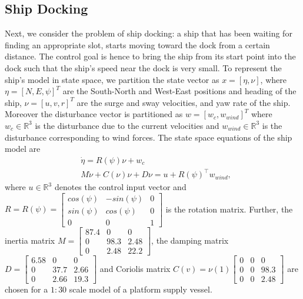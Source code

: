 \subsection{Ship Docking}\label{subsec:6dship}
Next, we consider the problem of ship docking: a ship that has been waiting for finding an appropriate slot, starts moving toward the dock from a certain distance. The control goal is hence to bring the ship from its start point into the dock such that the ship's speed near the dock is very small. To represent the ship's model in state space, we partition the state vector as $x=[\eta,\nu]$, where $\eta=[N,E,\psi]^T$ are the South-North and West-East positions and heading of the ship, $\nu = [u ,v ,r]^T$ are the surge and sway velocities, and yaw rate of the ship. Moreover the disturbance vector is partitioned as $w=[w_c,w_{wind}]^T$ where $w_c\in\mathbb R^3$ is the disturbance due to the current velocities and $w_{wind}\in\mathbb R^3$ is the disturbance corresponding to wind forces. The state space equations of the ship model are
\begin{align*}
&\dot{\eta}=R(\psi)\nu+w_c \\
&M\dot{\nu}+C(\nu)\nu+D\nu=u+R(\psi)^{\top}w_{wind},
\end{align*}
where $u\in\mathbb R^3$ denotes the control input vector and $R=R(\psi)=\begin{bmatrix}
cos(\psi) &-sin(\psi) &0\\
sin(\psi) & cos(\psi) & 0\\
0 & 0 & 1
\end{bmatrix}$ is the rotation matrix. Further, the inertia matrix $M=\begin{bmatrix}
87.4 & 0 & 0 \\
0 & 98.3 & 2.48 \\
0 & 2.48 & 22.2
\end{bmatrix}$, the damping matrix $D=\begin{bmatrix}
6.58 & 0 & 0 \\
0 & 37.7 & 2.66 \\
0 & 2.66 & 19.3
\end{bmatrix}$ and Coriolis matrix $C(v)=\nu(1)\begin{bmatrix}
0 & 0 & 0 \\
0 & 0 & 98.3 \\
0 & 0 & 2.48
\end{bmatrix}$ are chosen for a $1:30$ scale model of a platform supply vessel.


